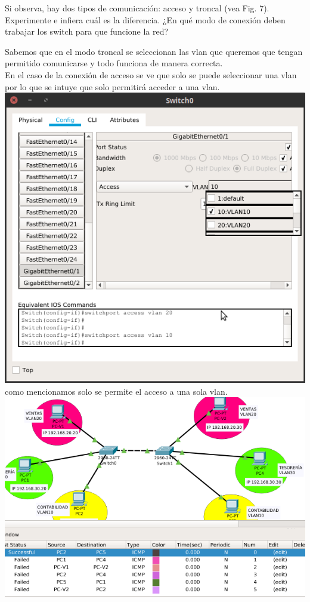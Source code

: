 \begin{definicion}[]{
Si observa, hay dos tipos de comunicaci\'on: acceso y troncal
(vea Fig. 7). Experimente e infiera cu\'al es la diferencia.
¿En qu\'e modo de conexi\'on deben trabajar los switch para que
funcione la red?
}
\end{definicion}
Sabemos que en el modo troncal se seleccionan las vlan que queremos que tengan permitido comunicarse y todo funciona de manera correcta.\\
En el caso de la conexi\'on de acceso se ve que solo se puede seleccionar una vlan por lo que se intuye que solo permitir\'a acceder a una vlan.
\\
\includegraphics[scale=0.5]{img/access.png} \\
como mencionamos solo se permite el acceso a una sola vlan.\\
\includegraphics[scale=0.5]{img/dijimos.png} 

